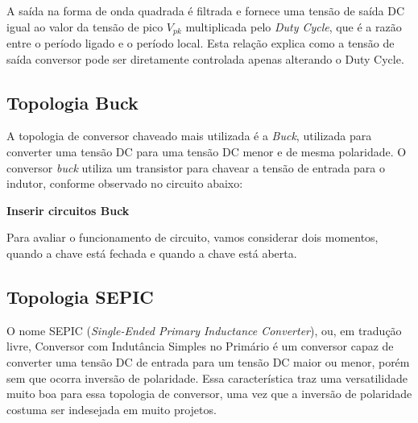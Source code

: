 A saída na forma de onda quadrada é filtrada e fornece uma tensão de saída DC igual ao valor da tensão de pico $V_{pk}$ multiplicada pelo \textit{Duty Cycle}, que é a razão entre o período ligado e o período local. Esta relação explica como a tensão de saída conversor pode ser diretamente controlada apenas alterando o Duty Cycle.  

\subsection{Topologia Buck}
A topologia de conversor chaveado mais utilizada é a \textit{Buck}, utilizada para converter uma tensão DC para uma tensão DC menor e de mesma polaridade. O conversor \textit{buck} utiliza um transistor para chavear a tensão de entrada para o indutor, conforme observado no circuito abaixo:

\textbf{ Inserir circuitos Buck }

Para avaliar o funcionamento de circuito, vamos considerar dois momentos, quando a chave está fechada e quando a chave está aberta.










\subsection{Topologia SEPIC}
O nome SEPIC (\textit{Single-Ended Primary Inductance Converter}), ou, em tradução livre, Conversor com Indutância Simples no Primário é um conversor capaz de converter uma tensão DC de entrada para um tensão DC maior ou menor, porém sem que ocorra inversão de polaridade. Essa característica traz uma versatilidade muito boa para essa topologia de conversor, uma vez que a inversão de polaridade costuma ser indesejada em muito projetos. 

